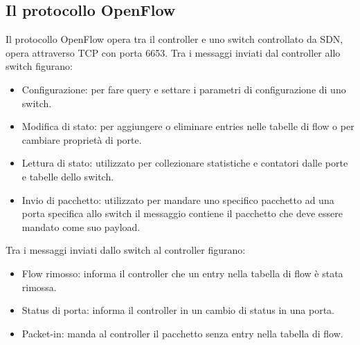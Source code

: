\subsection{Il protocollo OpenFlow}
Il protocollo OpenFlow opera tra il controller e uno switch controllato da SDN, opera attraverso TCP con porta 6653. Tra i messaggi inviati dal controller
allo switch figurano:
\begin{itemize}
\item Configurazione: per fare query e settare i parametri di configurazione di uno switch.
\item Modifica di stato: per aggiungere o eliminare entries nelle tabelle di flow o per cambiare propriet\`a di porte.
\item Lettura di stato: utilizzato per collezionare statistiche e contatori dalle porte e tabelle dello switch. 
\item Invio di pacchetto: utilizzato per mandare uno specifico pacchetto ad una porta specifica allo switch il messaggio contiene il pacchetto che deve 
essere mandato come suo payload.
\end{itemize}
Tra i messaggi inviati dallo switch al controller figurano:
\begin{itemize}
\item Flow rimosso: informa il controller che un entry nella tabella di flow \`e stata rimossa. 
\item Status di porta: informa il controller in un cambio di status in una porta.
\item Packet-in: manda al controller il pacchetto senza entry nella tabella di flow. 
\end{itemize}
